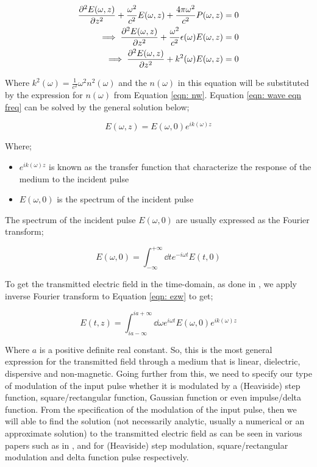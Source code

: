 \begin{align}
	\pdv[2]{E(\omega, z)}{z} + \frac{\omega^{2}}{c^{2}} E(\omega, z) + \frac{4\pi\omega^{2}}{c^{2}} P(\omega, z) &= 0\\
	\implies \pdv[2]{E(\omega, z)}{z} + \frac{\omega^{2}}{c^{2}} \epsilon(\omega) E(\omega, z) &= 0\\
	\implies \pdv[2]{E(\omega, z)}{z} + k^{2} (\omega) E(\omega, z) &= 0 \label{eqn: wave eqn freq}
\end{align}

Where $k^{2}(\omega) = \frac{1}{c^{2}} \omega^{2} n^{2}(\omega)$ and the $n(\omega)$ in this equation will be substituted by the expression for $n(\omega)$ from Equation \ref{eqn: nw}. Equation \ref{eqn: wave eqn freq} can be solved by the general solution below;

\begin{equation}
	E(\omega, z) = E(\omega, 0) e^{i k(\omega) z}
	\label{eqn: ezw}
\end{equation}

Where;

\begin{itemize}
	\item $e^{i k(\omega) z}$ is known as the transfer function that characterize the response of the medium to the incident pulse
	\item $E(\omega, 0)$ is the spectrum of the incident pulse
\end{itemize}

The spectrum of the incident pulse $E(\omega, 0)$ are usually expressed as the Fourier transform;

\begin{equation}
    E(\omega, 0) = \int_{-\infty}^{+\infty} \dd{t} e^{-i\omega t} E(t, 0)
\end{equation}

To get the transmitted electric field in the time-domain, as done in \cite{Jeong2011}, we apply inverse Fourier transform to Equation \ref{eqn: ezw} to get;

\begin{equation}
    E(t, z) = \int_{ia - \infty}^{ia + \infty} \dd{\omega} e^{i\omega t} E(\omega, 0) e^{i k(\omega) z}
    \label{eqn: ezta}
\end{equation}

Where $a$ is a positive definite real constant. So, this is the most general expression for the transmitted field through a medium that is linear, dielectric, dispersive and non-magnetic. Going further from this, we need to specify our type of modulation of the input pulse whether it is modulated by a (Heaviside) step function, square/rectangular function, Gaussian function or even impulse/delta function. From the specification of the modulation of the input pulse, then we will able to find the solution (not necessarily analytic, usually a numerical or an approximate solution) to the transmitted electric field as can be seen in various papers such as in ,  and  for (Heaviside) step modulation, square/rectangular modulation and delta function pulse respectively.

